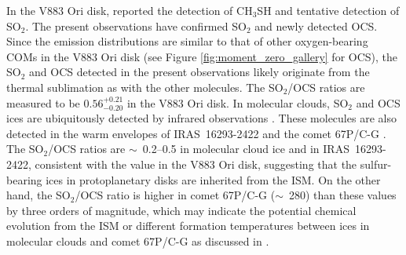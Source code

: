 \documentclass[twocolumn, twocolappendix, astrosymb, times]{aastex631}
\begin{document}
In the V883 Ori disk, \citet{Lee2019} reported the detection of CH$_3$SH and tentative detection of SO$_2$. The present observations have confirmed SO$_2$ and newly detected OCS.
Since the emission distributions are similar to that of other oxygen-bearing COMs in the V883 Ori disk (see Figure \ref{fig:moment_zero_gallery} for OCS), the SO$_2$ and OCS detected in the present observations likely originate from the thermal sublimation as with the other molecules. The SO$_2$/OCS ratios are measured to be $0.56_{-0.20}^{+0.21}$ in the V883 Ori disk. In molecular clouds, SO$_2$ and OCS ices are ubiquitously detected by infrared observations \citep[e.g.,][]{Boogert2015, McClure2023}. These molecules are also detected in the warm envelopes of IRAS~16293-2422 \citep{Drozdovskaya2018} and the comet 67P/C-G \citep{Calmonte2016}. The SO$_2$/OCS ratios are $\sim$~0.2--0.5 in molecular cloud ice and in IRAS~16293-2422, consistent with the value in the V883 Ori disk, suggesting that the sulfur-bearing ices in protoplanetary disks are inherited from the ISM. On the other hand, the SO$_2$/OCS ratio is higher in comet 67P/C-G ($\sim$~280) than these values by three orders of magnitude, which may indicate the potential chemical evolution from the ISM or different formation temperatures between ices in molecular clouds and comet 67P/C-G as discussed in \citet{Drozdovskaya2018}.



\end{document}

